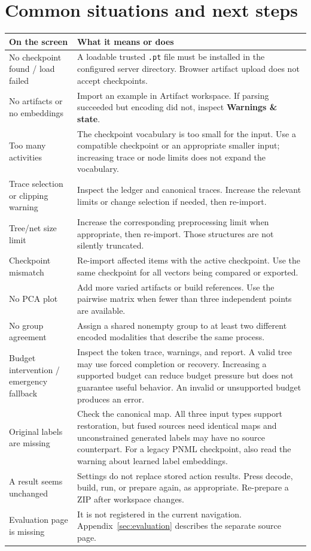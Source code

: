 \documentclass[11pt,a4paper]{article}
\makeatletter
\newcommand{\ui}[1]{\textbf{#1}}
\newcommand{\code}[1]{\nolinkurl{#1}}
\newenvironment{controls}{%
  \small\begin{longtable}{@{}>{\raggedright\arraybackslash}p{.34\linewidth}
    >{\raggedright\arraybackslash}p{.62\linewidth}@{}}
  \toprule\textbf{On the screen} & \textbf{What it means or does}\\\midrule\endhead
  \bottomrule\endfoot
}{\end{longtable}\normalsize}
\makeatother
\begin{document}
\section{Common situations and next steps}
\begin{controls}
No checkpoint found / load failed & A loadable trusted \code{.pt} file must
be installed in the configured server directory. Browser artifact upload does
not accept checkpoints.\\
No artifacts or no embeddings & Import an example in Artifact workspace.
If parsing succeeded but encoding did not, inspect \ui{Warnings \& state}.\\
Too many activities & The checkpoint vocabulary is too small for the input.
Use a compatible checkpoint or an appropriate smaller input; increasing trace
or node limits does not expand the vocabulary.\\
Trace selection or clipping warning & Inspect the ledger and canonical traces.
Increase the relevant limits or change selection if needed, then re-import.\\
Tree/net size limit & Increase the corresponding preprocessing limit when
appropriate, then re-import. Those structures are not silently truncated.\\
Checkpoint mismatch & Re-import affected items with the active checkpoint.
Use the same checkpoint for all vectors being compared or exported.\\
No PCA plot & Add more varied artifacts or build references. Use the pairwise
matrix when fewer than three independent points are available.\\
No group agreement & Assign a shared nonempty group to at least two different
encoded modalities that describe the same process.\\
Budget intervention / emergency fallback & Inspect the token trace, warnings,
and report. A valid tree may use forced completion or recovery. Increasing a
supported budget can reduce budget pressure but does not guarantee useful
behavior. An invalid or unsupported budget produces an error.\\
Original labels are missing & Check the canonical map. All three input types
support restoration, but fused sources need identical maps and unconstrained
generated labels may have no source counterpart. For a legacy PNML checkpoint,
also read the warning about learned label embeddings.\\
A result seems unchanged & Settings do not replace stored action results.
Press decode, build, run, or prepare again, as appropriate. Re-prepare a ZIP
after workspace changes.\\
Evaluation page is missing & It is not registered in the current navigation.
Appendix~\ref{sec:evaluation} describes the separate source page.\\
\end{controls}
\end{document}

